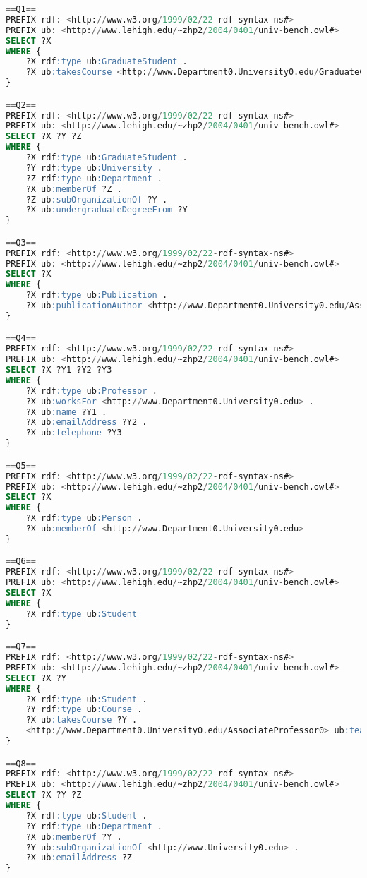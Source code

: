 \begin{lstlisting}[language=SQL, basicstyle=\ttfamily\scriptsize,morekeywords={PREFIX,OPTIONAL,FILTER,java,rdf,rdfs,url},label=lubm-sparql-queries,basewidth=0.5em]
==Q1==
PREFIX rdf: <http://www.w3.org/1999/02/22-rdf-syntax-ns#>
PREFIX ub: <http://www.lehigh.edu/~zhp2/2004/0401/univ-bench.owl#>
SELECT ?X  
WHERE {
    ?X rdf:type ub:GraduateStudent .
    ?X ub:takesCourse <http://www.Department0.University0.edu/GraduateCourse0> .
}

==Q2==
PREFIX rdf: <http://www.w3.org/1999/02/22-rdf-syntax-ns#>
PREFIX ub: <http://www.lehigh.edu/~zhp2/2004/0401/univ-bench.owl#>
SELECT ?X ?Y ?Z
WHERE {
    ?X rdf:type ub:GraduateStudent .
    ?Y rdf:type ub:University .
    ?Z rdf:type ub:Department .
    ?X ub:memberOf ?Z .
    ?Z ub:subOrganizationOf ?Y .
    ?X ub:undergraduateDegreeFrom ?Y
}

==Q3==
PREFIX rdf: <http://www.w3.org/1999/02/22-rdf-syntax-ns#>
PREFIX ub: <http://www.lehigh.edu/~zhp2/2004/0401/univ-bench.owl#>
SELECT ?X
WHERE {
    ?X rdf:type ub:Publication .
    ?X ub:publicationAuthor <http://www.Department0.University0.edu/AssistantProfessor0>
}

==Q4==
PREFIX rdf: <http://www.w3.org/1999/02/22-rdf-syntax-ns#>
PREFIX ub: <http://www.lehigh.edu/~zhp2/2004/0401/univ-bench.owl#>
SELECT ?X ?Y1 ?Y2 ?Y3
WHERE {
    ?X rdf:type ub:Professor .
    ?X ub:worksFor <http://www.Department0.University0.edu> .
    ?X ub:name ?Y1 .
    ?X ub:emailAddress ?Y2 .
    ?X ub:telephone ?Y3
}

==Q5==
PREFIX rdf: <http://www.w3.org/1999/02/22-rdf-syntax-ns#>
PREFIX ub: <http://www.lehigh.edu/~zhp2/2004/0401/univ-bench.owl#>
SELECT ?X
WHERE {
    ?X rdf:type ub:Person .
    ?X ub:memberOf <http://www.Department0.University0.edu>
}

==Q6==
PREFIX rdf: <http://www.w3.org/1999/02/22-rdf-syntax-ns#>
PREFIX ub: <http://www.lehigh.edu/~zhp2/2004/0401/univ-bench.owl#>
SELECT ?X
WHERE {
    ?X rdf:type ub:Student
}

==Q7==
PREFIX rdf: <http://www.w3.org/1999/02/22-rdf-syntax-ns#>
PREFIX ub: <http://www.lehigh.edu/~zhp2/2004/0401/univ-bench.owl#>
SELECT ?X ?Y
WHERE {
    ?X rdf:type ub:Student .
    ?Y rdf:type ub:Course .
    ?X ub:takesCourse ?Y .
    <http://www.Department0.University0.edu/AssociateProfessor0> ub:teacherOf ?Y
}

==Q8==
PREFIX rdf: <http://www.w3.org/1999/02/22-rdf-syntax-ns#>
PREFIX ub: <http://www.lehigh.edu/~zhp2/2004/0401/univ-bench.owl#>
SELECT ?X ?Y ?Z
WHERE {
    ?X rdf:type ub:Student .
    ?Y rdf:type ub:Department .
    ?X ub:memberOf ?Y .
    ?Y ub:subOrganizationOf <http://www.University0.edu> .
    ?X ub:emailAddress ?Z
}


\end{lstlisting}
